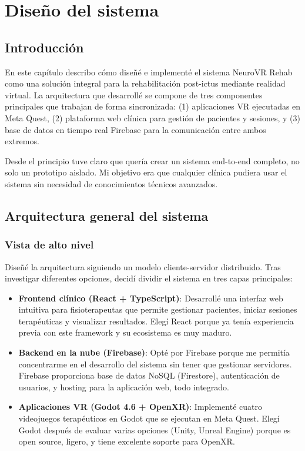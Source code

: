 \chapter{Diseño del sistema}

\section{Introducción}

En este capítulo describo cómo diseñé e implementé el sistema NeuroVR Rehab como una solución integral para la rehabilitación post-ictus mediante realidad virtual. La arquitectura que desarrollé se compone de tres componentes principales que trabajan de forma sincronizada: (1) aplicaciones VR ejecutadas en Meta Quest, (2) plataforma web clínica para gestión de pacientes y sesiones, y (3) base de datos en tiempo real Firebase para la comunicación entre ambos extremos.

Desde el principio tuve claro que quería crear un sistema end-to-end completo, no solo un prototipo aislado. Mi objetivo era que cualquier clínica pudiera usar el sistema sin necesidad de conocimientos técnicos avanzados.

\section{Arquitectura general del sistema}

\subsection{Vista de alto nivel}

Diseñé la arquitectura siguiendo un modelo cliente-servidor distribuido. Tras investigar diferentes opciones, decidí dividir el sistema en tres capas principales:

\begin{itemize}
    \item \textbf{Frontend clínico (React + TypeScript)}: Desarrollé una interfaz web intuitiva para fisioterapeutas que permite gestionar pacientes, iniciar sesiones terapéuticas y visualizar resultados. Elegí React porque ya tenía experiencia previa con este framework y su ecosistema es muy maduro.
    
    \item \textbf{Backend en la nube (Firebase)}: Opté por Firebase porque me permitía concentrarme en el desarrollo del sistema sin tener que gestionar servidores. Firebase proporciona base de datos NoSQL (Firestore), autenticación de usuarios, y hosting para la aplicación web, todo integrado.
    
    \item \textbf{Aplicaciones VR (Godot 4.6 + OpenXR)}: Implementé cuatro videojuegos terapéuticos en Godot que se ejecutan en Meta Quest. Elegí Godot después de evaluar varias opciones (Unity, Unreal Engine) porque es open source, ligero, y tiene excelente soporte para OpenXR.
\end{itemize}

